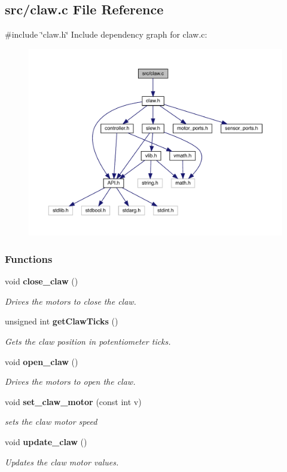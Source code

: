\subsection{src/claw.c File Reference}
\label{claw_8c}
{\ttfamily \#include \char`\"{}claw.\+h\char`\"{}}\newline
Include dependency graph for claw.\+c\+:\nopagebreak
\begin{figure}[H]
\begin{center}
\leavevmode
\includegraphics[width=350pt]{claw_8c__incl}
\end{center}
\end{figure}
\subsubsection*{Functions}
\begin{DoxyCompactItemize}
\item 
void \textbf{ close\+\_\+claw} ()
\begin{DoxyCompactList}\small\item\em Drives the motors to close the claw. \end{DoxyCompactList}\item 
unsigned int \textbf{ get\+Claw\+Ticks} ()
\begin{DoxyCompactList}\small\item\em Gets the claw position in potentiometer ticks. \end{DoxyCompactList}\item 
void \textbf{ open\+\_\+claw} ()
\begin{DoxyCompactList}\small\item\em Drives the motors to open the claw. \end{DoxyCompactList}\item 
void \textbf{ set\+\_\+claw\+\_\+motor} (const int v)
\begin{DoxyCompactList}\small\item\em sets the claw motor speed \end{DoxyCompactList}\item 
void \textbf{ update\+\_\+claw} ()
\begin{DoxyCompactList}\small\item\em Updates the claw motor values. \end{DoxyCompactList}\end{DoxyCompactItemize}


